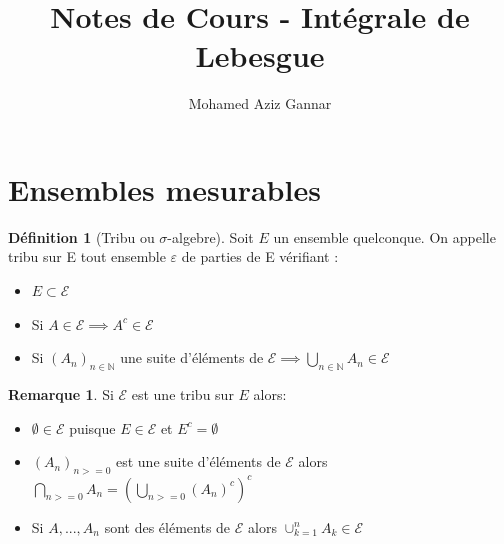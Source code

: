 \documentclass{article}[11pt]
\title{Notes de Cours - Intégrale de Lebesgue}
\author {Mohamed Aziz Gannar}
\theoremstyle{definition}
\newtheorem{definition}[theorem]{Définition}
\newtheorem{remarque}[theorem]{Remarque}
\newcommand{\eps}{\varepsilon}
\begin{document}
\maketitle
\tableofcontents
\section{Ensembles mesurables}
\begin{definition}[Tribu ou $\sigma$-algebre]\label{tribu}
  Soit $E$ un ensemble quelconque. On appelle tribu sur E tout ensemble $\eps$ de parties de E vérifiant :
  \begin{itemize}
    \item{$E \subset \mathcal{E}$}
    \item Si $A \in \mathcal{E} \implies A^c \in \mathcal{E}$
    \item{Si $(A_n)_{n \in \mathbb{N}} $ une suite d'éléments de $\mathcal{E} \implies \bigcup_{n\in \mathbb{N}}A_n \in \mathcal{E}$}
  \end{itemize}
\end{definition}

\begin{remarque}
  Si $\mathcal{E}$ est une tribu sur $E$ alors: 
  \begin{itemize}
  \item $\emptyset \in \mathcal{E}$ puisque $E \in \mathcal{E}$ et $E^c = \emptyset$
  \item $ (A_n)_{n >= 0}$ est une suite d'éléments de $\mathcal{E}$ alors $\bigcap_{n>=0}A_n = (\bigcup_{n >=0}(A_n)^c)^c$ 
  \item Si $A,...,A_n$ sont des éléments de $\mathcal{E}$ alors $\cup_{k=1}^{n}A_k \in \mathcal{E}$
  \end{itemize}
\end{remarque} 
\end{document}
